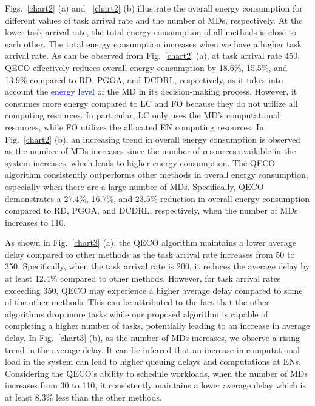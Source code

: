 \documentclass[10pt, journal,letterpaper]{IEEEtran}
\begin{document}
Figs.~\ref{chart2} (a) and ~\ref{chart2} (b) illustrate the overall energy consumption for different values of task arrival rate and the number of MDs, respectively. At the lower task arrival rate, the total energy consumption of all methods is close to each other. The total energy consumption increases when we have a higher task arrival rate.  
As can be observed from Fig.~\ref{chart2} (a), at task arrival rate 450, QECO effectively reduces overall energy consumption by 18.6\%, 15.5\%, and 13.9\% compared to RD, PGOA, and DCDRL, respectively, as it takes into account the \textcolor{blue}{energy level} of the MD in its decision-making process. However, it consumes more energy compared to LC and FO because they do not utilize all computing resources. In particular, LC only uses the MD's computational resources, while FO utilizes the allocated EN computing resources. 
In Fig.~\ref{chart2} (b), an increasing trend in overall energy consumption is observed as the number of MDs increases since the number of resources available in the system increases, which leads to higher energy consumption. The QECO algorithm consistently outperforms other methods in overall energy consumption, especially when there are a large number of MDs. Specifically, QECO demonstrates a 27.4\%, 16.7\%, and 23.5\% reduction in overall energy consumption compared to RD, PGOA, and DCDRL, respectively, when the number of MDs increases to 110.

As shown in Fig.~\ref{chart3} (a), the QECO algorithm maintains a lower average delay compared to other methods as the task arrival rate increases from 50 to 350. Specifically, when the task arrival rate is 200, it reduces the average delay by at least 12.4\% compared to other methods. However, for task arrival rates exceeding 350, QECO may experience a higher average delay compared to some of the other methods. This can be attributed to the fact that the other algorithms drop more tasks while our proposed algorithm is capable of completing a higher number of tasks, potentially leading to an increase in average delay. In Fig.~\ref{chart3} (b), as the number of MDs increases, we observe a rising trend in the average delay. It can be inferred that an increase in computational load in the system can lead to higher queuing delays and computations at ENs. Considering the QECO's ability to schedule workloads, when the number of MDs increases from 30 to 110, it consistently maintains a lower average delay which is at least 8.3\% less than the other methods.
\end{document}
